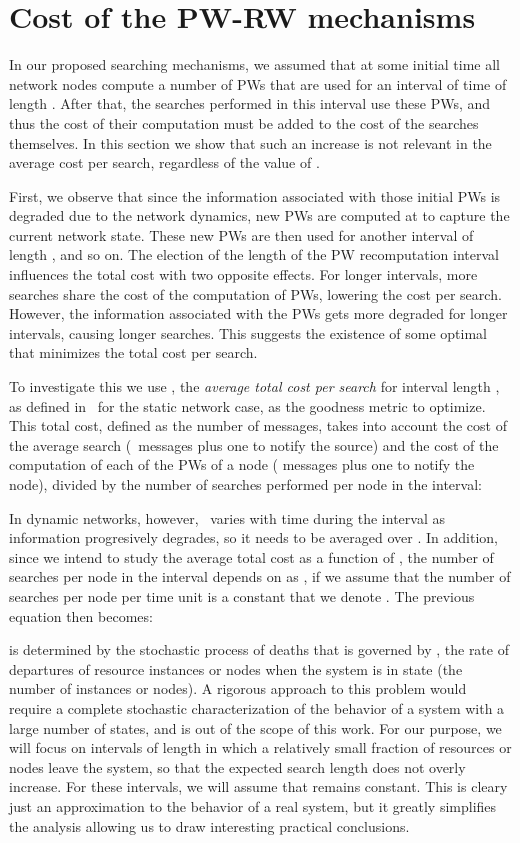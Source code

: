 \documentclass[]{elsarticle}
\begin{document}
\section{Cost of the PW-RW mechanisms}
\label{sec:cost}

In our proposed searching mechanisms, we assumed that at some initial time all network nodes compute a number  of PWs that are used for an interval of time of length . After that, the searches performed in this interval use these PWs, and thus the cost of their computation must be added to the cost of the searches themselves. In this section we show that such an increase is not relevant in the average cost per search, regardless of the value of .

First, we observe that since the information associated with those initial PWs is degraded due to the network dynamics, new PWs are computed at  to capture the current network state. These new PWs are then used for another interval of length , and so on. The election of the length of the PW recomputation interval  influences the total cost with two opposite effects. For longer intervals, more searches share the cost of the computation of PWs, lowering the cost per search. However, the information associated with the PWs gets more degraded for longer intervals, causing longer searches. This suggests the existence of some optimal  that minimizes the total cost per search.

To investigate this we use , the \emph{average total cost per search} for interval length , as defined in~\cite{Lopez:Computing} for the static network case, as the goodness metric to optimize. This total cost, defined as the number of messages, takes into account the cost of the average search (\Lsexp\ messages plus one to notify the source) and the cost of the computation of each of the  PWs of a node ( messages plus one to notify the node), divided by the number of searches  performed per node in the interval:
 
 

In dynamic networks, however, \Lsexp\ varies with time during the interval as information progresively degrades, so it needs to be averaged over . In addition, since we intend to study the average total cost as a function of , the number of searches per node in the interval depends on  as , if we assume that the number of searches per node per time unit is a constant that we denote . The previous equation then becomes:


 is determined by the stochastic process of deaths that is governed by , the rate of departures of resource instances or nodes when the system is in state  (the number of instances or nodes). A rigorous approach to this problem would require a complete stochastic characterization of the behavior of a system with a large number of states, and is out of the scope of this work. For our purpose, we will focus on intervals of length  in which a relatively small fraction of resources or nodes leave the system, so that the expected search length does not overly increase. For these intervals, we will assume that  remains constant. This is cleary just an approximation to the behavior of a real system, but it greatly simplifies the analysis allowing us to draw interesting practical conclusions.
\end{document}
